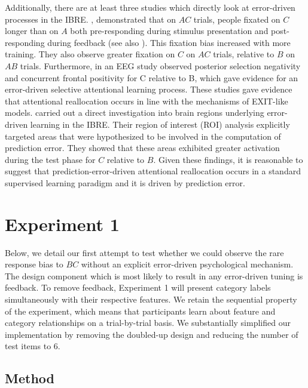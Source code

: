 \documentclass[10pt,letterpaper]{article}
\begin{document}
Additionally, there are at least three studies which directly look at error-driven processes in the IBRE.
, demonstrated that on $AC$ trials, people fixated on $C$ longer than on $A$ both pre-responding during stimulus presentation and post-responding during feedback (see also ).
This fixation bias increased with more training.
They also observe greater fixation on $C$ on $AC$ trials, relative to $B$ on $AB$ trials.
Furthermore,  in an EEG study observed posterior selection negativity and concurrent frontal positivity for C relative to B, which gave evidence for an error-driven selective attentional learning process.
These studies gave evidence that attentional reallocation occurs in line with the mechanisms of EXIT-like models.
 carried out a direct investigation into brain regions underlying error-driven learning in the IBRE.
Their region of interest (ROI) analysis explicitly targeted areas that were hypothesized to be involved in the computation of prediction error.
They showed that these areas exhibited greater activation during the test phase for $C$ relative to $B$.
Given these findings, it is reasonable to suggest that prediction-error-driven attentional reallocation occurs in a standard supervised learning paradigm and it is driven by prediction error.

\section{Experiment 1}

Below, we detail our first attempt to test whether we could observe the rare response bias to $BC$ without an explicit error-driven psychological mechanism.
The design component which is most likely to result in any error-driven tuning is feedback.
To remove feedback, Experiment 1 will present category labels simultaneously with their respective features.
We retain the sequential property of the experiment, which means that participants learn about feature and category relationships on a trial-by-trial basis.
We substantially simplified our implementation by removing the doubled-up design and reducing the number of test items to 6.

\subsection{Method}
\end{document}
